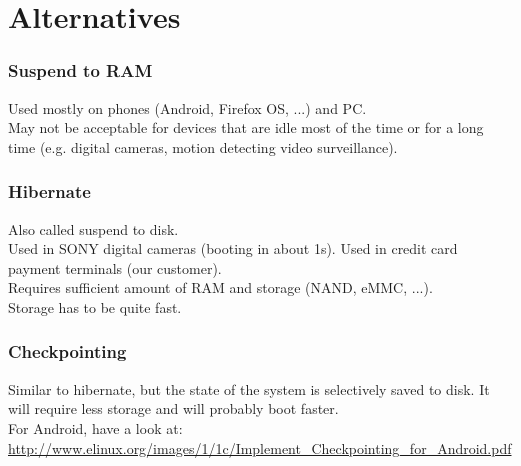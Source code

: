 \section{Alternatives}
\begin{frame}
\frametitle{Suspend to RAM}
Used mostly on phones (Android, Firefox OS, ...) and PC.\\
May not be acceptable for devices that are idle most of the time or
for a long time (e.g. digital cameras, motion detecting video surveillance).
\end{frame}

\begin{frame}
\frametitle{Hibernate}
Also called suspend to disk.\\
Used in SONY digital cameras (booting in about 1s). Used in credit
card payment terminals (our customer).\\
Requires sufficient amount of RAM and storage (NAND, eMMC, ...).\\
Storage has to be quite fast.
\end{frame}

\begin{frame}
\frametitle{Checkpointing}
Similar to hibernate, but the state of the system is selectively saved
to disk. It will require less storage and will probably boot faster.\\
For Android, have a look at:
\url{http://www.elinux.org/images/1/1c/Implement_Checkpointing_for_Android.pdf}
\end{frame}

